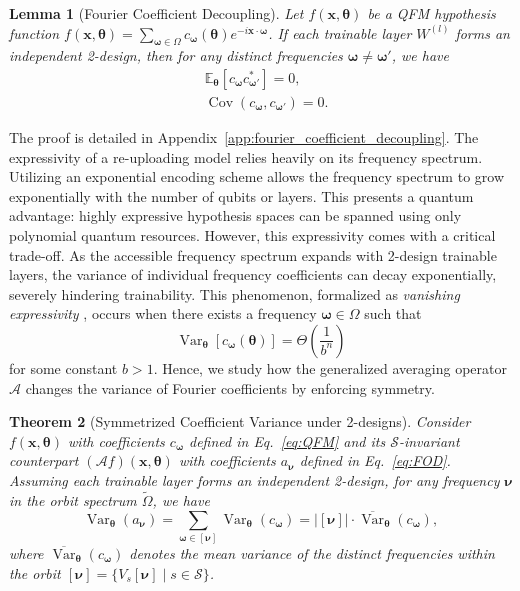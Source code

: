 \documentclass[%
 reprint,
 amsmath,amssymb,
 aps,
 pra,
]{revtex4-2}
\newtheorem{theorem}{Theorem}
\newtheorem{lemma}[theorem]{Lemma}
\theoremstyle{definition}
\begin{document}
\begin{lemma}[Fourier Coefficient Decoupling]
\label{lemma:fourier_coefficient_decoupling}
Let \(f(\bm{x},\bm{\theta})\) be a QFM hypothesis function \(f(\boldsymbol{x},\boldsymbol{\theta})=\sum_{\boldsymbol{\omega}\in\Omega}
c_{\boldsymbol{\omega}}(\boldsymbol{\theta}) e^{-i\boldsymbol{x}\cdot\boldsymbol{\omega}}\). If each trainable layer \(W^{(l)}\) forms an independent 2-design, then for any distinct frequencies \(\bm{\omega} \neq \bm{\omega}'\), we have
\begin{align}
&\mathbb{E}_{\bm{\theta}} [c_{\bm{\omega}} c_{\bm{\omega}'}^*] = 0,\\
&\operatorname{Cov}(c_{\bm{\omega}}, c_{\bm{\omega}'}) = 0.
\end{align}
\end{lemma}

The proof is detailed in Appendix~\ref{app:fourier_coefficient_decoupling}. The expressivity of a re-uploading model relies heavily on its frequency spectrum. Utilizing an exponential encoding scheme \cite{Shin_2023} allows the frequency spectrum to grow exponentially with the number of qubits or layers. This presents a quantum advantage: highly expressive hypothesis spaces can be spanned using only polynomial quantum resources. However, this expressivity comes with a critical trade-off. As the accessible frequency spectrum expands with 2-design trainable layers, the variance of individual frequency coefficients can decay exponentially, severely hindering trainability. This phenomenon, formalized as \emph{vanishing expressivity} \cite{Hela2025}, occurs when there exists a frequency \(\bm{\omega} \in \Omega\) such that
\begin{equation}
\operatorname{Var}_{\bm{\theta}}\left[c_{\bm{\omega}}(\bm{\theta})\right] = \Theta\!\left(\frac{1}{b^{n}}\right)
\end{equation}
for some constant \(b>1\). Hence, we study how the generalized averaging operator \(\mathcal{A}\) changes the variance of Fourier coefficients by enforcing symmetry.

\begin{theorem}[Symmetrized Coefficient Variance under 2-designs]
\label{theorem:exp_variance}
Consider \(f(\bm{x}, \bm{\theta})\) with coefficients \(c_{\bm{\omega}}\) defined in Eq.~\eqref{eq:QFM} and its \(\mathcal{S}\)-invariant counterpart \((\mathcal{A}f)(\bm{x}, \bm{\theta})\) with coefficients \(a_{\bm{\nu}}\) defined in Eq.~\eqref{eq:FOD}. Assuming each trainable layer forms an independent 2-design, for any frequency \(\bm{\nu}\) in the orbit spectrum \(\tilde{\Omega}\), we have
\begin{equation}
\operatorname{Var}_{\bm{\theta}}(a_{\bm{\nu}}) = \sum_{\bm{\omega} \in [\bm{\nu}]} \operatorname{Var}_{\bm{\theta}}(c_{\bm{\omega}}) = |[\bm{\nu}]| \cdot \overline{\operatorname{Var}}_{\bm{\theta}}(c_{\bm{\omega}}),
\end{equation}
where \(\overline{\operatorname{Var}}_{\bm{\theta}}(c_{\bm{\omega}})\) denotes the mean variance of the distinct frequencies within the orbit \([\bm{\nu}]=\{ V_s[\bm{\nu}] \mid s \in \mathcal{S} \}\).
\end{theorem}
\end{document}
